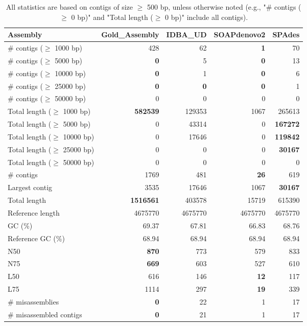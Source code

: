 \documentclass[12pt,a4paper]{article}
\begin{document}
\begin{table}[ht]
\begin{center}
\caption{All statistics are based on contigs of size $\geq$ 500 bp, unless otherwise noted (e.g., "\# contigs ($\geq$ 0 bp)" and "Total length ($\geq$ 0 bp)" include all contigs).}
\begin{tabular}{|l*{4}{|r}|}
\hline
Assembly & Gold\_Assembly & IDBA\_UD & SOAPdenovo2 & SPAdes \\ \hline
\# contigs ($\geq$ 1000 bp) & 428 & 62 & {\bf 1} & 70 \\ \hline
\# contigs ($\geq$ 5000 bp) & {\bf 0} & 5 & {\bf 0} & 13 \\ \hline
\# contigs ($\geq$ 10000 bp) & {\bf 0} & 1 & {\bf 0} & 6 \\ \hline
\# contigs ($\geq$ 25000 bp) & {\bf 0} & {\bf 0} & {\bf 0} & 1 \\ \hline
\# contigs ($\geq$ 50000 bp) & 0 & 0 & 0 & 0 \\ \hline
Total length ($\geq$ 1000 bp) & {\bf 582539} & 129353 & 1067 & 265613 \\ \hline
Total length ($\geq$ 5000 bp) & 0 & 43314 & 0 & {\bf 167272} \\ \hline
Total length ($\geq$ 10000 bp) & 0 & 17646 & 0 & {\bf 119842} \\ \hline
Total length ($\geq$ 25000 bp) & 0 & 0 & 0 & {\bf 30167} \\ \hline
Total length ($\geq$ 50000 bp) & 0 & 0 & 0 & 0 \\ \hline
\# contigs & 1769 & 481 & {\bf 26} & 619 \\ \hline
Largest contig & 3535 & 17646 & 1067 & {\bf 30167} \\ \hline
Total length & {\bf 1516561} & 403578 & 15719 & 615390 \\ \hline
Reference length & 4675770 & 4675770 & 4675770 & 4675770 \\ \hline
GC (\%) & 69.37 & 67.81 & 66.83 & 68.76 \\ \hline
Reference GC (\%) & 68.94 & 68.94 & 68.94 & 68.94 \\ \hline
N50 & {\bf 870} & 773 & 579 & 833 \\ \hline
N75 & {\bf 669} & 603 & 527 & 610 \\ \hline
L50 & 616 & 146 & {\bf 12} & 117 \\ \hline
L75 & 1114 & 297 & {\bf 19} & 339 \\ \hline
\# misassemblies & {\bf 0} & 22 & 1 & 17 \\ \hline
\# misassembled contigs & {\bf 0} & 21 & 1 & 17 \\ \hline

\end{tabular}
\end{center}
\end{table}
\end{document}
